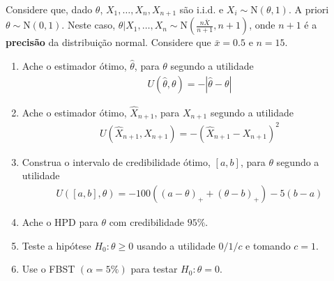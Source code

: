 \begin{exercise}
 Considere que, dado $\theta$, 
 $X_{1},\ldots,X_{n},X_{n+1}$ são i.i.d. e
 $X_{i} \sim \text{N}(\theta,1)$.
 A priori $\theta \sim \text{N}(0,1)$.
 Neste caso, $\theta|X_{1},\ldots,X_{n} \sim \text{N}(\frac{n\bar{X}}{n+1}, n+1)$, onde $n+1$ é 
 a \textbf{precisão} da distribuição normal.
 Considere que $\bar{x}=0.5$ e $n=15$.
 \begin{enumerate}[label=(\alph*)]
  \item Ache o estimador ótimo, $\hat{\theta}$, 
  para $\theta$ segundo a utilidade 
  \begin{align*}
   U(\hat{\theta},\theta)
   = -|\hat{\theta}-\theta|
  \end{align*}
  \item Ache o estimador ótimo, $\hat{X}_{n+1}$, 
  para $X_{n+1}$ segundo a utilidade 
  \begin{align*}
  U(\hat{X}_{n+1},X_{n+1}) 
  =-(\hat{X}_{n+1}-X_{n+1})^{2}
  \end{align*}
  \item Construa o intervalo de credibilidade ótimo, $[a,b]$, 
  para $\theta$ segundo a utilidade 
  \begin{align*}
   U([a,b],\theta) 
   = -100((a-\theta)_{+}+(\theta-b)_{+})-5(b-a)
  \end{align*}
  \item Ache o HPD para $\theta$ com credibilidade $95\%$.
  \item Teste a hipótese $H_{0}:\theta \geq 0$ usando 
  a utilidade $0/1/c$ e tomando $c=1$.
  \item Use o FBST $(\alpha=5\%)$ para testar $H_{0}: \theta=0$.
 \end{enumerate}
\end{exercise}

